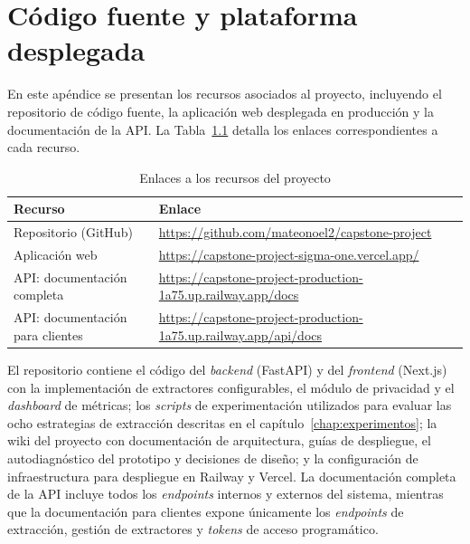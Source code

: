 \chapter{Código fuente y plataforma desplegada}\label{apendice:recursos}

En este apéndice se presentan los recursos asociados al proyecto, incluyendo el repositorio de código fuente, la aplicación web desplegada en producción y la documentación de la API. La Tabla~\ref{tab:recursos_proyecto} detalla los enlaces correspondientes a cada recurso.

\begin{table}[H]
\centering
\begin{tabular}{p{4.5cm} p{9.5cm}}
\toprule
\textbf{Recurso} & \textbf{Enlace} \\
\midrule
Repositorio (GitHub) & \url{https://github.com/mateonoel2/capstone-project} \\
Aplicación web & \url{https://capstone-project-sigma-one.vercel.app/} \\
API: documentación completa & \url{https://capstone-project-production-1a75.up.railway.app/docs} \\
API: documentación para clientes & \url{https://capstone-project-production-1a75.up.railway.app/api/docs} \\
\bottomrule
\end{tabular}
\caption{Enlaces a los recursos del proyecto}
\label{tab:recursos_proyecto}
\end{table}

\noindent El repositorio contiene el código del \textit{backend} (FastAPI) y del \textit{frontend} (Next.js) con la implementación de extractores configurables, el módulo de privacidad y el \textit{dashboard} de métricas; los \textit{scripts} de experimentación utilizados para evaluar las ocho estrategias de extracción descritas en el capítulo~\ref{chap:experimentos}; la wiki del proyecto con documentación de arquitectura, guías de despliegue, el autodiagnóstico del prototipo y decisiones de diseño; y la configuración de infraestructura para despliegue en Railway y Vercel. La documentación completa de la API incluye todos los \textit{endpoints} internos y externos del sistema, mientras que la documentación para clientes expone únicamente los \textit{endpoints} de extracción, gestión de extractores y \textit{tokens} de acceso programático.

